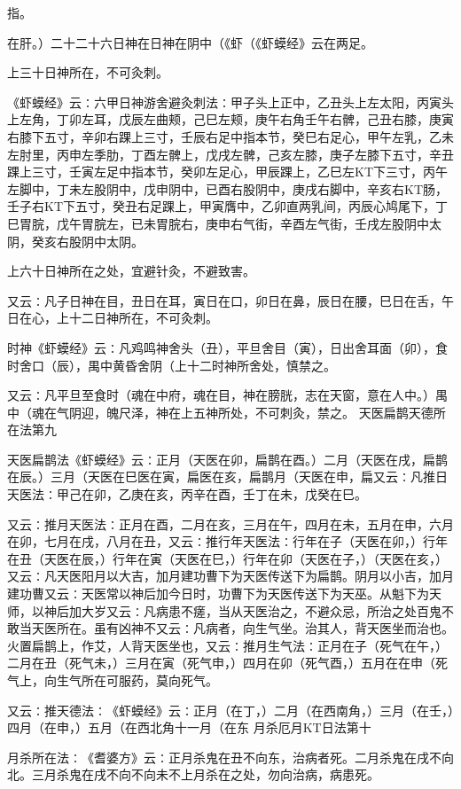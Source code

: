 \documentclass[a4paper,12pt,UTF8,twoside]{ctexbook}
\begin{document}
指。

在肝。）二十二十六日神在日神在阴中（《虾（《虾蟆经》云在两足。

上三十日神所在，不可灸刺。

《虾蟆经》云∶六甲日神游舍避灸刺法∶甲子头上正中，乙丑头上左太阳，丙寅头上左角，丁卯左耳，戊辰左曲颊，己巳左颊，庚午右角壬午右髀，己丑右膝，庚寅右膝下五寸，辛卯右踝上三寸，壬辰右足中指本节，癸巳右足心，甲午左乳，乙未左肘里，丙申左季肋，丁酉左髀上，戊戌左髀，己亥左膝，庚子左膝下五寸，辛丑踝上三寸，壬寅左足中指本节，癸卯左足心，甲辰踝上，乙巳左KT下三寸，丙午左脚中，丁未左股阴中，戊申阴中，已酉右股阴中，庚戌右脚中，辛亥右KT肠，壬子右KT下五寸，癸丑右足踝上，甲寅膺中，乙卯直两乳间，丙辰心鸠尾下，丁巳胃脘，戊午胃脘左，已未胃脘右，庚申右气街，辛酉左气街，壬戌左股阴中太阴，癸亥右股阴中太阴。

上六十日神所在之处，宜避针灸，不避致害。

又云∶凡子日神在目，丑日在耳，寅日在口，卯日在鼻，辰日在腰，巳日在舌，午日在心，上十二日神所在，不可灸刺。

时神《虾蟆经》云∶凡鸡鸣神舍头（丑），平旦舍目（寅），日出舍耳面（卯），食时舍口（辰），禺中黄昏舍阴（上十二时神所舍处，慎禁之。

又云∶凡平旦至食时（魂在中府，魂在目，神在膀胱，志在天窗，意在人中。）禺中（魂在气阴迎，魄尺泽，神在上五神所处，不可刺灸，禁之。
天医扁鹊天德所在法第九

天医扁鹊法《虾蟆经》云∶正月（天医在卯，扁鹊在酉。）二月（天医在戌，扁鹊在辰。）三月（天医在巳医在寅，扁医在亥，扁鹊月（天医在申，扁又云∶凡推日天医法∶甲己在卯，乙庚在亥，丙辛在酉，壬丁在未，戊癸在巳。

又云∶推月天医法∶正月在酉，二月在亥，三月在午，四月在未，五月在申，六月在卯，七月在戌，八月在丑，又云∶推行年天医法∶行年在子（天医在卯，）行年在丑（天医在辰，）行年在寅（天医在巳，）行年在卯（天医在子，）（天医在亥，）又云∶凡天医阳月以大吉，加月建功曹下为天医传送下为扁鹊。阴月以小吉，加月建功曹又云∶天医常以神后加今日时，功曹下为天医传送下为天巫。从魁下为天师，以神后加大岁又云∶凡病患不瘥，当从天医治之，不避众忌，所治之处百鬼不敢当天医所在。虽有凶神不又云∶凡病者，向生气坐。治其人，背天医坐而治也。火置扁鹊上，作艾，人背天医坐也，又云∶推月生气法∶正月在子（死气在午，）二月在丑（死气未，）三月在寅（死气申，）四月在卯（死气酉，）五月在在申（死气上，向生气所在可服药，莫向死气。

又云∶推天德法∶《虾蟆经》云∶正月（在丁，）二月（在西南角，）三月（在壬，）四月（在申，）五月（在西北角十一月（在东
月杀厄月KT日法第十

月杀所在法∶《耆婆方》云∶正月杀鬼在丑不向东，治病者死。二月杀鬼在戌不向北。三月杀鬼在戌不向不向未不上月杀在之处，勿向治病，病患死。
\end{document}
